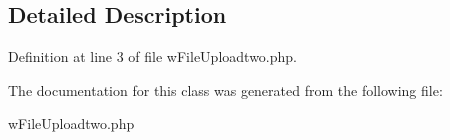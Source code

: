 \subsection{Detailed Description}


Definition at line 3 of file wFileUploadtwo.php.



The documentation for this class was generated from the following file:\begin{DoxyCompactItemize}
\item 
wFileUploadtwo.php\end{DoxyCompactItemize}
